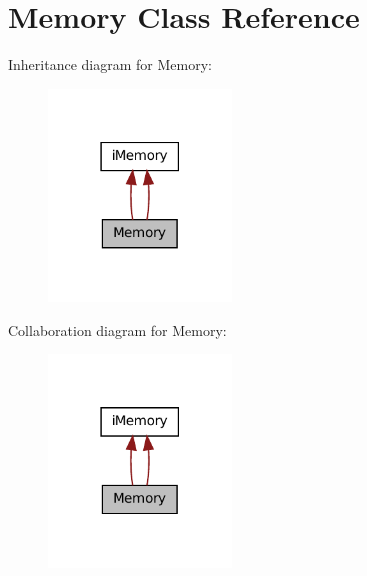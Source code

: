 \hypertarget{classMemory}{
\section{Memory Class Reference}
\label{classMemory}
}


Inheritance diagram for Memory:
\nopagebreak
\begin{figure}[H]
\begin{center}
\leavevmode
\includegraphics[width=138pt]{classMemory__inherit__graph}
\end{center}
\end{figure}


Collaboration diagram for Memory:
\nopagebreak
\begin{figure}[H]
\begin{center}
\leavevmode
\includegraphics[width=138pt]{classMemory__coll__graph}
\end{center}
\end{figure}
